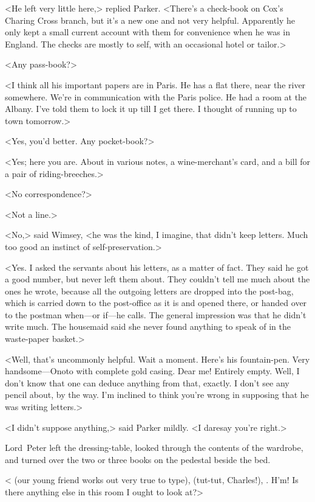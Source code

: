 <He left very little here,> replied Parker. <There's a check-book on Cox's Charing Cross branch, but it's a new one and not very helpful. Apparently he only kept a small current account with them for convenience when he was in England. The checks are mostly to self, with an occasional hotel or tailor.>

<Any pass-book?>

<I think all his important papers are in Paris. He has a flat there, near the river somewhere. We're in communication with the Paris police. He had a room at the Albany. I've told them to lock it up till I get there. I thought of running up to town tomorrow.>

<Yes, you'd better. Any pocket-book?>

<Yes; here you are. About  in various notes, a wine-merchant's card, and a bill for a pair of riding-breeches.>

<No correspondence?>

<Not a line.>

<No,> said Wimsey, <he was the kind, I imagine, that didn't keep letters. Much too good an instinct of self-preservation.>

<Yes. I asked the servants about his letters, as a matter of fact. They said he got a good number, but never left them about. They couldn't tell me much about the ones he wrote, because all the outgoing letters are dropped into the post-bag, which is carried down to the post-office as it is and opened there, or handed over to the postman when—or if—he calls. The general impression was that he didn't write much. The housemaid said she never found anything to speak of in the waste-paper basket.>

<Well, that's uncommonly helpful. Wait a moment. Here's his fountain-pen. Very handsome—Onoto with complete gold casing. Dear me! Entirely empty. Well, I don't know that one can deduce anything from that, exactly. I don't see any pencil about, by the way. I'm inclined to think you're wrong in supposing that he was writing letters.>

<I didn't suppose anything,> said Parker mildly. <I daresay you're right.>

Lord~Peter left the dressing-table, looked through the contents of the wardrobe, and turned over the two or three books on the pedestal beside the bed.

< (our young friend works out very true to type),  (tut-tut, Charles!), . H'm! Is there anything else in this room I ought to look at?>

